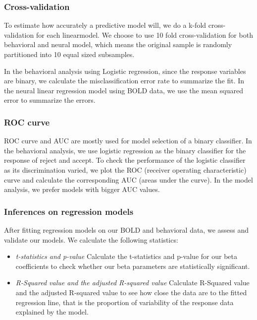 \documentclass[11pt]{article}
\begin{document}
\subsubsection{Cross-validation}

To estimate how accurately a predictive model will, we do a k-fold 
cross-validation for each linearmodel. We choose to use 10 fold 
cross-validation for both behavioral and neural model,
which means the original sample is randomly partitioned into 10 equal sized 
subsamples. 
\par
In the behavioral analysis using Logistic regression, since the response 
variables are binary, we calculate the misclassification error rate to 
summarize the fit. In the neural linear regression model using BOLD data, we 
use the mean squared error to summarize the errors.

\subsubsection{ROC curve}

ROC curve and AUC are mostly used for model selection of a binary classifier. 
In the behavioral analysis, we use logistic regression as the binary 
classifier for the response of reject and accept. To check the performance of 
the logistic classifier as its discrimination varied, we plot the ROC 
(receiver operating characteristic) curve and calculate the corresponding AUC 
(areas under the curve). In the model analysis, we prefer models with bigger 
AUC values.

\subsubsection{Inferences on regression models}

After fitting regression models on our BOLD and behavioral data, we assess 
and validate our models. We calculate the following statistics:
\begin{itemize}
\item \emph{t-statistics and p-value} Calculate the t-statistics and p-value for 
our beta coefficients to check whether our beta parameters are statistically 
significant.
\item \emph{R-Squared value and the adjusted R-squared value} Calculate 
R-Squared value and the adjusted R-squared value to see how close the data are 
to the fitted regression line, that is the proportion of variability of the 
response data explained by the model.
\end{itemize}
\end{document}
